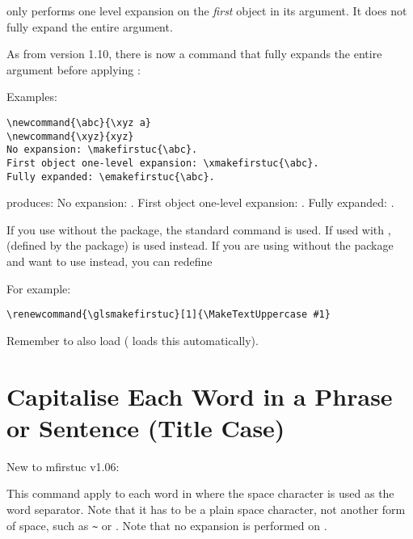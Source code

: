 \documentclass{nlctdoc}
\begin{document}
\begin{important}
 only performs one level expansion on the
\emph{first} object in its argument. It does not fully expand the entire
argument.
\end{important}

As from version 1.10, there is now a command that fully expands the
entire argument before applying :
\begin{definition}[\DescribeMacro\emakefirstuc]
\end{definition}

Examples:
\begin{verbatim}
\newcommand{\abc}{\xyz a}
\newcommand{\xyz}{xyz}
No expansion: \makefirstuc{\abc}.
First object one-level expansion: \xmakefirstuc{\abc}.
Fully expanded: \emakefirstuc{\abc}.
\end{verbatim}
produces: 
\renewcommand{\abc}{\xyz a}%
\newcommand{\xyz}{xyz}
No expansion: \makefirstuc{\abc}.
First object one-level expansion: \xmakefirstuc{\abc}.
Fully expanded: \emakefirstuc{\abc}.

If you use  without the  package, 
the standard  command is used. If used with
,  (defined by the 
package) is used instead. If you are using 
without the  package and want to use
 instead, you can redefine
\begin{definition}[\DescribeMacro\glsmakefirstuc]
\end{definition}
For example:
\begin{verbatim}
\renewcommand{\glsmakefirstuc}[1]{\MakeTextUppercase #1}
\end{verbatim}
Remember to also load  ( loads this
automatically).

\section{Capitalise Each Word in a Phrase or Sentence (Title Case)}
\label{sec:capitalisewords}

New to mfirstuc v1.06:
\begin{definition}[\DescribeMacro{\capitalisewords}]
\end{definition}
This command apply  to each word in 
where the space character is used as the word separator. Note that
it has to be a plain space character, not another form of space,
such as \verb|~| or . Note that no expansion is performed
on .
\end{document}
